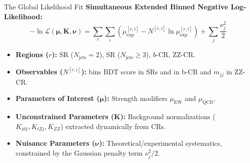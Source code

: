 \documentclass{beamer}
\begin{document}
\begin{frame}[noframenumbering]{The Global Likelihood Fit}
    \textbf{Simultaneous Extended Binned Negative Log-Likelihood:}
    \vspace{-0.2cm}
    \begin{equation*}
        -\ln\mathcal{L}(\boldsymbol{\mu}, \boldsymbol{K}, \boldsymbol{\nu}) = \sum_{r} \sum_{i} \left( \mu_{\text{exp}}^{[r,i]} - N^{[r,i]} \ln \mu_{\text{exp}}^{[r,i]} \right) + \sum_{j} \frac{\nu_j^2}{2}
    \end{equation*}
        
    \begin{itemize}
        \item \textbf{Regions ($r$):} SR ($N_{\text{jets}}=2$), SR ($N_{\text{jets}}\ge 3$), $b$-CR, ZZ-CR.
        \item \textbf{Observables ($N^{[r,i]}$):} bins BDT score in SRs and in b-CR and $m_{jj}$ in ZZ-CR.
        \item \textbf{Parameters of Interest ($\boldsymbol{\mu}$):} Strength modifiers $\mu_{\text{EW}}$ and $\mu_{\text{QCD}}$.
        \item \textbf{Unconstrained Parameters ($\boldsymbol{K}$):} Background normalizations ($K_{t\bar{t}V}, K_{tZj}, K_{ZZ}$) extracted dynamically from CRs.
        \item \textbf{Nuisance Parameters ($\boldsymbol{\nu}$):} Theoretical/experimental systematics, constrained by the Gaussian penalty term $\nu_j^2/2$.
    \end{itemize}
\end{frame}
\end{document}

